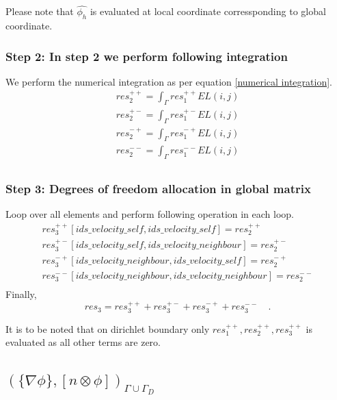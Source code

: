 \documentclass[a4paper,openany]{book}
\begin{document}
Please note that $\hat{\phi_h}$ is evaluated at local coordinate corressponding to global coordinate.

\subsubsection{Step 2: In step 2 we perform following integration}
 
We perform the numerical integration as per equation \eqref{numerical integration}.
\begin{equation}
\begin{split}
res_2^{++} = \int_{\Gamma} res_1^{++} EL(i,j)\\
res_2^{+-} = \int_{\Gamma} res_1^{+-} EL(i,j)\\
res_2^{-+} = \int_{\Gamma} res_1^{-+} EL(i,j)\\
res_2^{--} = \int_{\Gamma} res_1^{--} EL(i,j)\\
\end{split}
\end{equation}

\subsubsection{Step 3: Degrees of freedom allocation in global matrix}

Loop over all elements and perform following operation in each loop.
\begin{equation}
\begin{split}
res_3^{++}[ids\_velocity\_self,ids\_velocity\_self] = res_2^{++}\\
res_3^{+-}[ids\_velocity\_self,ids\_velocity\_neighbour] = res_2^{+-}\\
res_3^{-+}[ids\_velocity\_neighbour,ids\_velocity\_self] = res_2^{-+}\\
res_3^{--}[ids\_velocity\_neighbour,ids\_velocity\_neighbour] = res_2^{--}\\
\end{split}
\end{equation}
Finally,
\begin{equation}
res_3 = res_3^{++} + res_3^{+-} + res_3^{-+} + res_3^{--} \quad \textrm{.}
\end{equation}

It is to be noted that on dirichlet boundary only $res_1^{++}, res_2^{++}, res_3^{++}$ is evaluated as all other terms are zero.

\subsection{$(\lbrace \nabla \phi \rbrace, [n \otimes \phi])_{\Gamma \cup \Gamma_D}$}
\end{document}
